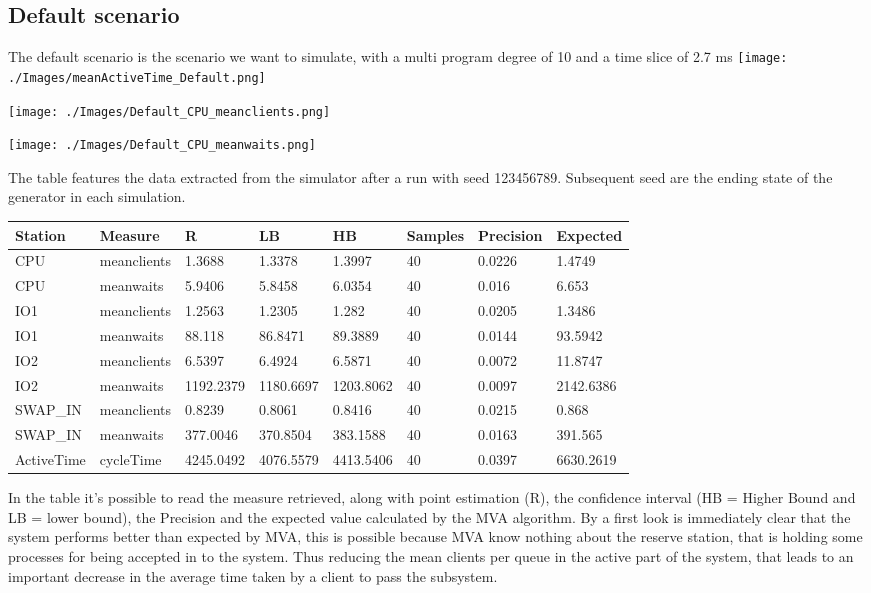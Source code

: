 \documentclass[12pt,a4paper]{article}
\begin{document}
\subsection{Default scenario}
The default scenario is the scenario we want to simulate, with a multi program degree of 10 and a time slice of 2.7 ms 
\texttt{[image: ./Images/meanActiveTime\_Default.png]}

\texttt{[image: ./Images/Default\_CPU\_meanclients.png]}

\texttt{[image: ./Images/Default\_CPU\_meanwaits.png]}

The table features the data extracted from the simulator after a run with seed 123456789. Subsequent seed are the ending state of the generator in each simulation.

\begin{table}[!ht]
    \centering
    \begin{tabular}{|l|l|l|l|l|l|l|l|}
    \hline
        Station & Measure & R & LB & HB & Samples & Precision & Expected \\ \hline
        CPU & meanclients & 1.3688 & 1.3378 & 1.3997 & 40 & 0.0226 & 1.4749 \\ \hline
        CPU & meanwaits & 5.9406 & 5.8458 & 6.0354 & 40 & 0.016 & 6.653 \\ \hline
        IO1 & meanclients & 1.2563 & 1.2305 & 1.282 & 40 & 0.0205 & 1.3486 \\ \hline
        IO1 & meanwaits & 88.118 & 86.8471 & 89.3889 & 40 & 0.0144 & 93.5942 \\ \hline
        IO2 & meanclients & 6.5397 & 6.4924 & 6.5871 & 40 & 0.0072 & 11.8747 \\ \hline
        IO2 & meanwaits & 1192.2379 & 1180.6697 & 1203.8062 & 40 & 0.0097 & 2142.6386 \\ \hline
        SWAP\_IN & meanclients & 0.8239 & 0.8061 & 0.8416 & 40 & 0.0215 & 0.868 \\ \hline
        SWAP\_IN & meanwaits & 377.0046 & 370.8504 & 383.1588 & 40 & 0.0163 & 391.565 \\ \hline
        ActiveTime & cycleTime & 4245.0492 & 4076.5579 & 4413.5406 & 40 & 0.0397 & 6630.2619 \\ \hline
    \end{tabular}
\end{table}

In the table it's possible to read the measure retrieved, along with point estimation (R), the confidence interval (HB = Higher Bound and LB = lower bound), the Precision and the expected value calculated by the MVA algorithm. By a first look is immediately clear that the system performs better than expected by MVA, this is possible because MVA know nothing about the reserve station, that is holding some processes for being accepted in to the system. Thus reducing the mean clients per queue in the active part of the system, that leads to an important decrease in the average time taken by a client to pass the subsystem.
\end{document}
